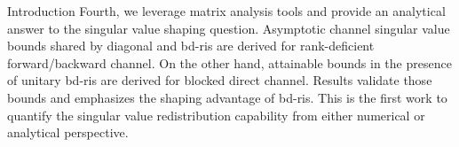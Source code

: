 \documentclass[journal]{IEEEtran}
\begin{document}
\begin{section}{Introduction}
	Fourth, we leverage matrix analysis tools and provide an analytical answer to the singular value shaping question.
	Asymptotic channel singular value bounds shared by diagonal and \gls{bd}-\gls{ris} are derived for rank-deficient forward/backward channel.
	On the other hand, attainable bounds in the presence of unitary \gls{bd}-\gls{ris} are derived for blocked direct channel.
	Results validate those bounds and emphasizes the shaping advantage of \gls{bd}-\gls{ris}.
	This is the first work to quantify the singular value redistribution capability from either numerical or analytical perspective.





\end{section}
\end{document}
